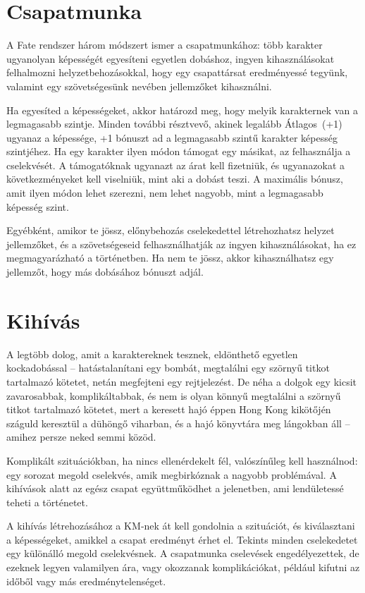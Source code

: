 \section{Csapatmunka}

A Fate rendszer három módszert ismer a csapatmunkához: több karakter ugyanolyan képességét egyesíteni egyetlen dobáshoz, ingyen kihasználásokat felhalmozni helyzetbehozásokkal, hogy egy csapattársat eredményessé tegyünk, valamint egy szövetségesünk nevében jellemzőket kihasználni.

Ha egyesíted a képességeket, akkor határozd meg, hogy melyik karakternek van a legmagasabb szintje. Minden további résztvevő, akinek legalább Átlagos~(+1) ugyanaz a képessége, +1 bónuszt ad a legmagasabb szintű karakter képesség szintjéhez. Ha egy karakter ilyen módon támogat egy másikat, az felhasználja a cselekvését. A támogatóknak ugyanazt az árat kell fizetniük, és ugyanazokat a következményeket kell viselniük, mint aki a dobást teszi. A maximális bónusz, amit ilyen módon lehet szerezni, nem lehet nagyobb, mint a legmagasabb képesség szint.

Egyébként, amikor te jössz, előnybehozás cselekedettel létrehozhatsz helyzet jellemzőket, és a szövetségeseid felhasználhatják az ingyen kihasználásokat, ha ez megmagyarázható a történetben. Ha nem te jössz, akkor kihasználhatsz egy jellemzőt, hogy más dobásához bónuszt adjál.

\section{Kihívás}

A legtöbb dolog, amit a karaktereknek tesznek, eldönthető egyetlen kockadobással – hatástalanítani egy bombát, megtalálni egy szörnyű titkot tartalmazó kötetet, netán megfejteni egy rejtjelezést. De néha a dolgok egy kicsit zavarosabbak, komplikáltabbak, és nem is olyan könnyű megtalálni a szörnyű titkot tartalmazó kötetet, mert a keresett hajó éppen Hong Kong kikötőjén száguld keresztül a dühöngő viharban, és a hajó könyvtára meg lángokban áll – amihez persze neked semmi közöd.

Komplikált szituációkban, ha nincs ellenérdekelt fél, valószínűleg  kell használnod: egy sorozat megold cselekvés, amik megbirkóznak a nagyobb problémával. A kihívások alatt az egész csapat együttműködhet a jelenetben, ami lendületessé teheti a történetet.

A kihívás létrehozásához a KM‑nek át kell gondolnia a szituációt, és kiválasztani a képességeket, amikkel a csapat eredményt érhet el. Tekints minden cselekedetet egy különálló megold cselekvésnek. A csapatmunka cselevések engedélyezettek, de ezeknek legyen valamilyen ára, vagy okozzanak komplikációkat, például kifutni az időből vagy más eredménytelenséget.

